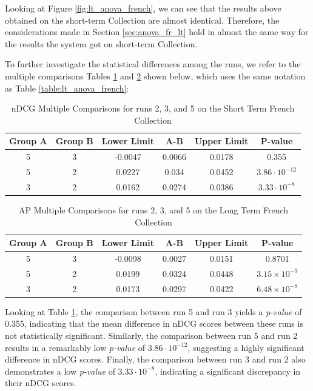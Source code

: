 Looking at Figure \ref{fig:lt_anova_french}, we can see that the results above obtained on the short-term Collection are almost identical.
Therefore, the considerations made in Section \ref{sec:anova_fr_lt} hold in almost the same way for the results the system got on short-term Collection.  

To further investigate the statistical differences among the runs, we refer to the multiple comparisons Tables \ref{table:st_anova_french} and \ref{table:st_anova_french_ap} shown below, which uses the same notation as Table \ref{table:lt_anova_french}:

\begin{table}[!h]
    \centering
    \caption{\ac{nDCG} Multiple Comparisons for runs 2, 3, and 5 on the Short Term French Collection}
    \label{table:st_anova_french}
    \begin{tabular}{cccccc}
    \hline
    Group A & Group B & Lower Limit & A-B & Upper Limit & P-value \\ \hline
    5 & 3 & -0.0047 & 0.0066 & 0.0178 & 0.355 \\
    5 & 2 & 0.0227 & 0.034 & 0.0452 & $3.86 \cdot 10^{-12}$ \\
    3 & 2 & 0.0162 & 0.0274 & 0.0386 & $3.33 \cdot 10^{-8}$ \\ \hline
    \end{tabular}
\end{table}

\begin{table}[!h]
    \centering
    \caption{\ac{AP} Multiple Comparisons for runs 2, 3, and 5 on the Long Term French Collection}
    \label{table:st_anova_french_ap}
    \begin{tabular}{cccccc}
    \hline
    Group A & Group B & Lower Limit & A-B & Upper Limit & P-value \\ \hline
    5 & 3 & -0.0098 & 0.0027 & 0.0151 & 0.8701 \\
    5 & 2 & 0.0199 & 0.0324 & 0.0448 & $3.15 \times 10^{-9}$ \\
    3 & 2 & 0.0173 & 0.0297 & 0.0422 & $6.48 \times 10^{-8}$ \\ \hline
    \end{tabular}
\end{table}
 
Looking at Table \ref{table:st_anova_french}, the comparison between run 5 and run 3 yields a \textit{p-value} of 0.355, indicating that the mean difference in \ac{nDCG} scores between these runs is not statistically significant. 
Similarly, the comparison between run 5 and run 2 results in a remarkably low \textit{p-value} of $3.86 \cdot 10^{-12}$, suggesting a highly significant difference in \ac{nDCG} scores. 
Finally, the comparison between run 3 and run 2 also demonstrates a low \textit{p-value} of $3.33 \cdot 10^{-8}$, indicating a significant discrepancy in their \ac{nDCG} scores.

